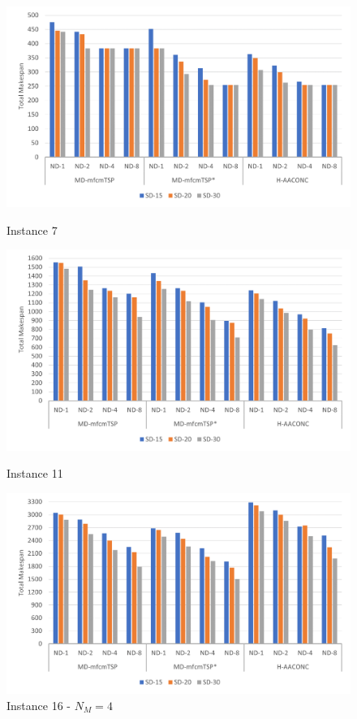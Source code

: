 \documentclass{article}
\begin{document}
	\begin{figure}[h]
		\centering
		\begin{minipage}{0.33\textwidth}
			\centering
			\includegraphics[scale=0.42]{p07_drones}\;
			\caption{Instance 7}
			\label{fig:p07_drones}
		\end{minipage}
		\begin{minipage}{0.33\textwidth}
			\centering
			\includegraphics[scale=0.42]{p11_drones}\;
			\caption{Instance 11}
			\label{fig:p11_drones}
		\end{minipage}
		\begin{minipage}{0.33\textwidth}
			\centering
			\includegraphics[scale=0.42]{p35_drones}\;
			\caption{Instance 16 - $N_M=4$}
			\label{fig:p35_drones}
		\end{minipage}
	\end{figure}
	
	\;
	\;
	\;
	
	\clearpage
	\printbibliography
	
\end{document}
